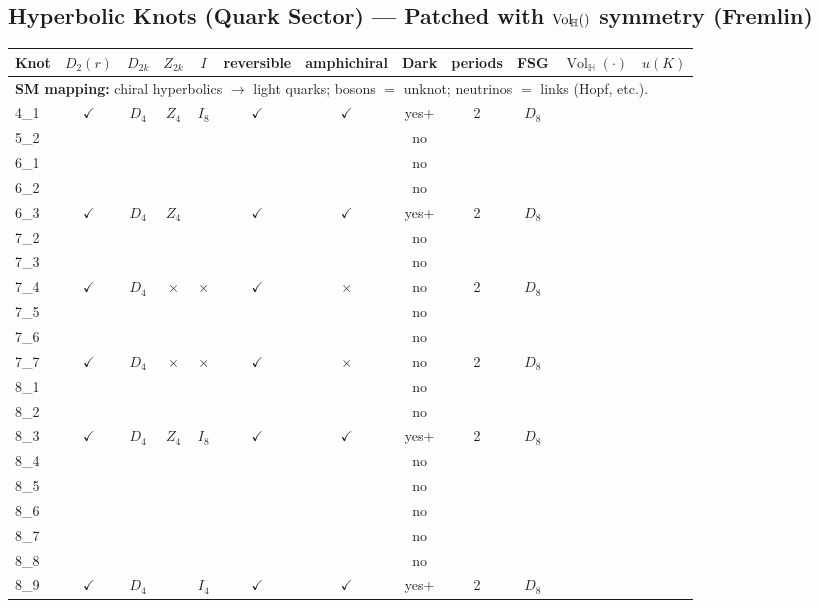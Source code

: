 \documentclass[a4paper,11pt]{article}
\newcommand{\VolH}[1]{\operatorname{Vol}_{\!\mathbb{H}}(#1)}
\begin{document}
\subsection*{Hyperbolic Knots (Quark Sector) — Patched with $\VolH$ symmetry (Fremlin)}
\begin{longtable}{lccccccccccc}
\toprule
Knot & $D_2(r)$ & $D_{2k}$ & $Z_{2k}$ & $I$ & reversible & amphichiral & Dark & periods & FSG & $\VolH{\cdot}$ & $u(K)$ \\
\midrule
\multicolumn{12}{l}{\textbf{SM mapping:} chiral hyperbolics $\to$ light quarks; bosons $=$ unknot; neutrinos $=$ links (Hopf, etc.).} \\ \hline
4\_1 & $\checkmark$ & $D_4$ & $Z_4$ & $I_8$ & $\checkmark$ & $\checkmark$ & yes+ & 2 & $D_8$ &  &  \\
5\_2 &  &  &  &  &  &  & no &  &  &  &  \\
6\_1 &  &  &  &  &  &  & no &  &  &  &  \\
6\_2 &  &  &  &  &  &  & no &  &  &  &  \\
6\_3 & $\checkmark$ & $D_4$ & $Z_4$ &  & $\checkmark$ & $\checkmark$ & yes+ & 2 & $D_8$ &  &  \\
7\_2 &  &  &  &  &  &  & no &  &  &  &  \\
7\_3 &  &  &  &  &  &  & no &  &  &  &  \\
7\_4 & $\checkmark$ & $D_4$ & $\times$ & $\times$ & $\checkmark$ & $\times$ & no & 2 & $D_8$ &  &  \\
7\_5 &  &  &  &  &  &  & no &  &  &  &  \\
7\_6 &  &  &  &  &  &  & no &  &  &  &  \\
7\_7 & $\checkmark$ & $D_4$ & $\times$ & $\times$ & $\checkmark$ & $\times$ & no & 2 & $D_8$ &  &  \\
8\_1 &  &  &  &  &  &  & no &  &  &  &  \\
8\_2 &  &  &  &  &  &  & no &  &  &  &  \\
8\_3 & $\checkmark$ & $D_4$ & $Z_4$ & $I_8$ & $\checkmark$ & $\checkmark$ & yes+ & 2 & $D_8$ &  &  \\
8\_4 &  &  &  &  &  &  & no &  &  &  &  \\
8\_5 &  &  &  &  &  &  & no &  &  &  &  \\
8\_6 &  &  &  &  &  &  & no &  &  &  &  \\
8\_7 &  &  &  &  &  &  & no &  &  &  &  \\
8\_8 &  &  &  &  &  &  & no &  &  &  &  \\
8\_9 & $\checkmark$ & $D_4$ &  & $I_4$ & $\checkmark$ & $\checkmark$ & yes+ & 2 & $D_8$ &  &  \\

\end{longtable}
\end{document}
